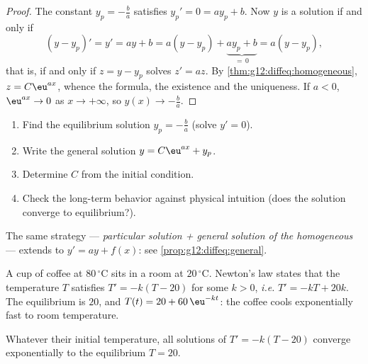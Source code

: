 \begin{proof}
The constant $y_p = -\frac{b}{a}$ satisfies $y_p' = 0 = a y_p + b$. Now $y$
is a solution if and only if
\[
(y - y_p)' = y' = ay + b = a(y - y_p) + \underbrace{a y_p + b}_{=\,0}
= a (y - y_p),
\]
that is, if and only if $z = y - y_p$ solves $z' = az$. By
\cref{thm:g12:diffeq:homogeneous}, $z = C\eu^{ax}$, whence the formula, the
existence and the uniqueness. If $a < 0$, $\eu^{ax} \to 0$ as
$x \to +\infty$, so $y(x) \to -\frac ba$.
\end{proof}

\begin{method}[Solving $y' = ay + b$ with an initial condition]\label{met:g12:diffeq:solve}
\begin{enumerate}
  \item Find the equilibrium solution $y_p = -\frac{b}{a}$ (solve $y' = 0$).
  \item Write the general solution $y = C\eu^{ax} + y_p$.
  \item Determine $C$ from the initial condition.
  \item Check the long-term behavior against physical intuition (does the
        solution converge to equilibrium?).
\end{enumerate}
The same strategy --- \emph{particular solution + general solution of the
homogeneous } --- extends to $y' = ay + f(x)$: see
\cref{prop:g12:diffeq:general}.
\end{method}

\begin{example}\label{ex:g12:diffeq:cooling}
A cup of coffee at $80\,^\circ$C sits in a room at $20\,^\circ$C. Newton's law states
that the temperature $T$ satisfies $T' = -k(T - 20)$ for some $k > 0$,
\emph{i.e.} $T' = -kT + 20k$. The equilibrium is $20$, and
$T(t) = 20 + 60\,\eu^{-kt}$: the coffee cools exponentially fast to room
temperature.
\end{example}

\begin{omfigure}

{\small Whatever their initial temperature, all solutions of
$T' = -k(T - 20)$ converge exponentially to the equilibrium $T = 20$.}
\end{omfigure}

